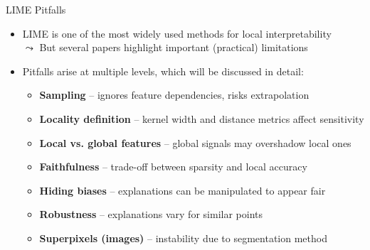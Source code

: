 \documentclass[11pt,compress,t,notes=noshow, aspectratio=169, xcolor=table]{beamer}
\begin{document}
\begin{frame}{LIME Pitfalls}
  \begin{itemize}
  	\item %
  	LIME is one of the most widely used methods for local interpretability\\ 
  	$\leadsto$ But several papers highlight important (practical) limitations
  	\item Pitfalls arise at multiple levels, which will be discussed in detail:
    \begin{itemize}
  \item \textbf{Sampling} -- ignores feature dependencies, risks extrapolation
  \item \textbf{Locality definition} -- kernel width and distance metrics affect sensitivity
  \item \textbf{Local vs. global features} -- global signals may overshadow local ones
  \item \textbf{Faithfulness} -- trade-off between sparsity and local accuracy
  \item \textbf{Hiding biases} -- explanations can be manipulated to appear fair
  \item \textbf{Robustness} -- explanations vary for similar points
  \item \textbf{Superpixels (images)} -- instability due to segmentation method
\end{itemize}
  \end{itemize}
  
\end{frame}
  
\end{document}
